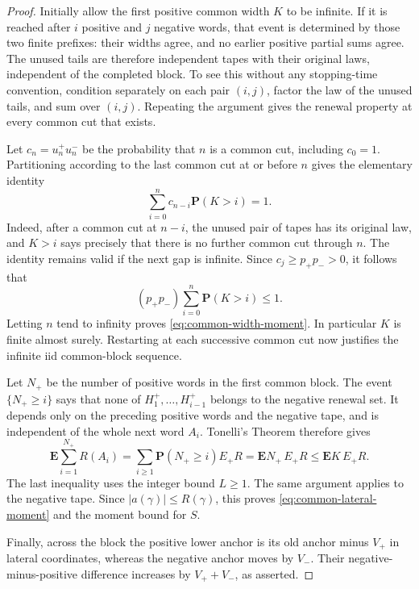 \begin{proof}
Initially allow the first positive common width $K$ to be infinite.
If it is reached after $i$ positive and $j$ negative words, that
event is determined by those two finite prefixes: their widths
agree, and no earlier positive partial sums agree.  The unused
tails are therefore independent tapes with their original laws,
independent of the completed block.  To see this without any
stopping-time convention, condition separately on each pair
$(i,j)$, factor the law of the unused tails, and sum over $(i,j)$.
Repeating the argument gives the renewal property at every common
cut that exists.

Let $c_n=u_n^+u_n^-$ be the probability that $n$ is a common cut,
including $c_0=1$.  Partitioning according to the last common cut
at or before $n$ gives the elementary identity
\[
 \sum_{i=0}^n c_{n-i}\mathbf P(K>i)=1.
\]
Indeed, after a common cut at $n-i$, the unused pair of tapes has
its original law, and $K>i$ says precisely that there is no further
common cut through $n$.  The identity remains valid if the next
gap is infinite.  Since $c_j\ge p_+p_->0$, it follows that
\[
 (p_+p_-)\sum_{i=0}^n\mathbf P(K>i)\le1.
\]
Letting $n$ tend to infinity proves
\eqref{eq:common-width-moment}.  In particular $K$ is finite
almost surely.  Restarting at each successive common cut now
justifies the infinite iid common-block sequence.

Let $N_+$ be the number of positive words in the first common
block.  The event $\{N_+\ge i\}$ says that none of
$H_1^+,\ldots,H_{i-1}^+$ belongs to the negative renewal set.
It depends only on the preceding positive words and the negative
tape, and is independent of the whole next word $A_i$.
Tonelli's Theorem therefore gives
\[
 \mathbf E\sum_{i=1}^{N_+}R(A_i)
 =\sum_{i\ge1}\mathbf P(N_+\ge i)E_+R
 =\mathbf E N_+\,E_+R
 \le\mathbf E K\,E_+R.
\]
The last inequality uses the integer bound $L\ge1$.
The same argument applies to the negative tape.  Since
$|a(\gamma)|\le R(\gamma)$, this proves
\eqref{eq:common-lateral-moment} and the moment bound for $S$.

Finally, across the block the positive lower anchor is its old
anchor minus $V_+$ in lateral coordinates, whereas the negative
anchor moves by $V_-$.  Their negative-minus-positive difference
increases by $V_++V_-$, as asserted.
\end{proof}

